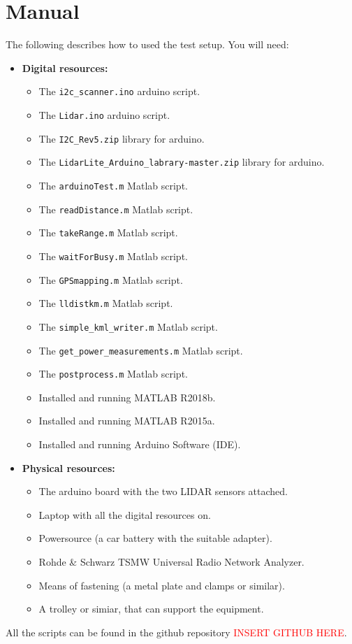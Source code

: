 \documentclass[a4paper,twoside, 12pt]{article}
\begin{document}
\section{Manual}
The following describes how to used the test setup. You will need:
\begin{itemize}
	\item \textbf{Digital resources:}
	\begin{itemize}
		\item The \texttt{i2c\_scanner.ino} arduino script.
		\item The \texttt{Lidar.ino} arduino script.
		\item The \texttt{I2C\_Rev5.zip} library for arduino.
		\item The \texttt{LidarLite\_Arduino\_labrary-master.zip} library for arduino.
		\item The \texttt{arduinoTest.m} Matlab script.
		\item The \texttt{readDistance.m} Matlab script.
		\item The \texttt{takeRange.m} Matlab script.
		\item The \texttt{waitForBusy.m} Matlab script.
		\item The \texttt{GPSmapping.m} Matlab script.
		\item The \texttt{lldistkm.m} Matlab script.
		\item The \texttt{simple\_kml\_writer.m} Matlab script.
		\item The \texttt{get\_power\_measurements.m} Matlab script.
		\item The \texttt{postprocess.m} Matlab script.
		\item Installed and running MATLAB R2018b.
		\item Installed and running MATLAB R2015a.
		\item Installed and running Arduino Software (IDE).
	\end{itemize}
	\item \textbf{Physical resources:}
	\begin{itemize}
		\item The arduino board with the two LIDAR sensors attached. 
		\item Laptop with all the digital resources on.
		\item Powersource (a car battery with the suitable adapter).
		\item Rohde \& Schwarz TSMW Universal Radio Network Analyzer.
		\item Means of fastening (a metal plate and clamps or similar).
		\item A trolley or simiar, that can support the equipment.
	\end{itemize}
\end{itemize}
All the scripts can be found in the github repository \textcolor{red}{INSERT GITHUB HERE}.
\end{document}
